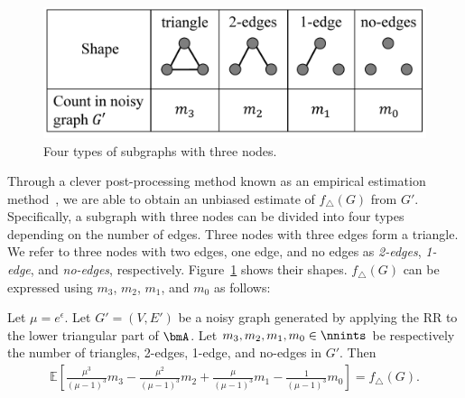 \begin{figure}
\centering
\includegraphics[width=0.9\linewidth]{fig/triplet_shape.pdf}
\vspace{-4mm}
\caption{Four types of subgraphs with three nodes.}
\label{chap1-fig:triplet_shape}
\end{figure}

Through 
a 
clever post-processing 
method 
known as an empirical estimation method~\cite{Kairouz_ICML16,Murakami_USENIX19,Wang_USENIX17},
we are able to obtain an unbiased estimate of $f_\triangle(G)$ 
from $G'$. 
Specifically, a subgraph with three nodes can be divided into four types depending on the number of edges. 
Three nodes with three edges form a triangle. 
We refer to three nodes with two edges, one edge, and no edges as \textit{2-edges},  \textit{1-edge}, and  \textit{no-edges}, respectively. 
Figure~\ref{chap1-fig:triplet_shape} shows their shapes. 
$f_\triangle(G)$ can be expressed using $m_3$, $m_2$, $m_1$, and $m_0$ as follows:

\begin{proposition}\label{chap1-prop:triangle_emp}
  Let $\mu = e^\epsilon$. 
  Let $G'=(V,E')$ be a noisy graph generated by applying the RR to the lower triangular part of $\bmA$.
  Let $m_3, m_2, m_1, m_0 \in \nnints$ be respectively the number of triangles, 2-edges, 1-edge, and no-edges in $G'$. 
  Then 
  \begin{align}
      \textstyle{\mathbb{E}\left[\frac{\mu^3}{(\mu-1)^3}m_3 - \frac{\mu^2}{(\mu-1)^3} m_2 + \frac{\mu}{(\mu-1)^3} m_1 - \frac{1}{(\mu-1)^3} m_0 \right] = f_\triangle(G).}
      \label{chap1-eq:triangle_emp}
  \end{align}
\end{proposition}

